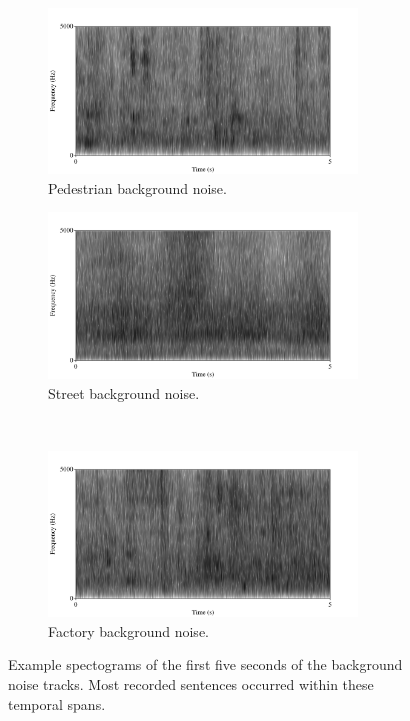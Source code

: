 \begin{figure}[h!]
\begin{subfigure}{0.475\linewidth}
  \label{fig:cafe-bkgrnd}
\end{subfigure}%
\\[2ex]
\begin{subfigure}{0.475\linewidth}
  \centering
  \includegraphics[width=0.9\textwidth]{figure/spctgrm-ped-background.png}
  \caption{Pedestrian background noise.}
  \label{fig:ped-bkgrnd}
\end{subfigure}
\qquad
\begin{subfigure}{0.475\linewidth}
  \centering
  \includegraphics[width=0.9\textwidth]{figure/spctgrm-str-background.png}
  \caption{Street background noise.}
  \label{fig:str-bkgrnd}
\end{subfigure}%
\\[2ex]
\begin{center}
\begin{subfigure}{0.475\linewidth}
  \centering
  \includegraphics[width=0.9\textwidth]{figure/spctgrm-fac-background.png}
  \caption{Factory background noise.}
  \label{fig:fac-bkgrnd}
\end{subfigure}
\end{center}
\caption{Example spectograms of the first five seconds of the background noise tracks. Most recorded sentences occurred within these temporal spans.}
\label{fig:bkgrnd-noises}
\end{figure}

